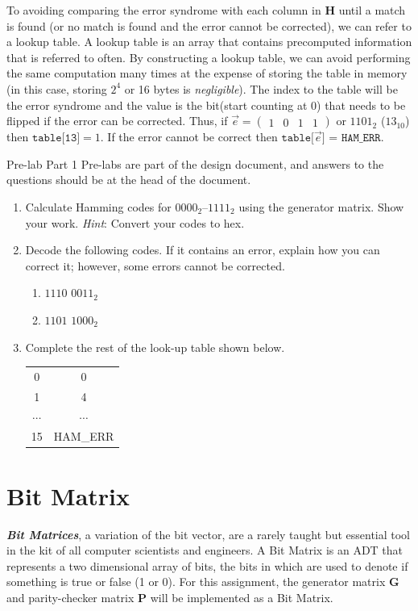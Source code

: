 \documentclass[11pt]{article}
\begin{document}
To avoiding comparing the error
syndrome with each column in $\boldsymbol{H}$ until a match is found (or no match is found and the error cannot be 
corrected), we can refer to a lookup table. A lookup table is an array that contains precomputed information that is
referred to often. By constructing a lookup table, we can avoid performing the same computation many times at the expense
of storing the table in memory (in this case, storing $2^4$ or 16 bytes is \emph{negligible}).
The index to the table will be the error syndrome and the value is the
bit(start counting at 0) that needs to be flipped if the error can be corrected.
Thus, if $\Vec{e} = \begin{pmatrix}1 & 0 & 1 & 1 \end{pmatrix}$ or $1101_2$ ($13_{10}$) then $\texttt{table[13]}=1$.
If the error cannot be correct then $\texttt{table[$\Vec{e}$] = HAM\_ERR}$.

\medskip
\begin{prelab}{Pre-lab Part 1}
    \Warning Pre-labs are part of the design document, and answers to the
    questions should be at the head of the document.

    \begin{enumerate}
        \item Calculate Hamming codes for $0000_2$--$1111_2$ using the generator matrix. 
        Show your work. \textit{Hint}: Convert your codes to hex. 
        \item Decode the following codes. If it contains an error, explain
        how you can correct it; however, some errors cannot be corrected.
        \begin{enumerate}
            \item $1110$ $0011_2$
            \item $1101$ $1000_2$
        \end{enumerate}
        \item Complete the rest of the look-up table shown below.\\
        \begin{tabular}{ c|c } 
            0 & 0 \\
            1 & 4 \\
            $\cdots$ & $\cdots$ \\
            15 & HAM\_ERR
        \end{tabular}
    \end{enumerate}
\end{prelab}

\section{Bit Matrix}
\textit{\textbf{Bit Matrices}}, a variation of the bit vector, are a rarely taught but
essential tool in the kit of all computer scientists and engineers. A Bit Matrix is an
ADT that represents
a two dimensional array of bits, the bits in which are used to denote if something is true or
false (1 or 0). For this assignment, the generator matrix $\boldsymbol{G}$ and 
parity-checker matrix $\boldsymbol{P}$ will be implemented as a Bit Matrix. 
\end{document}
